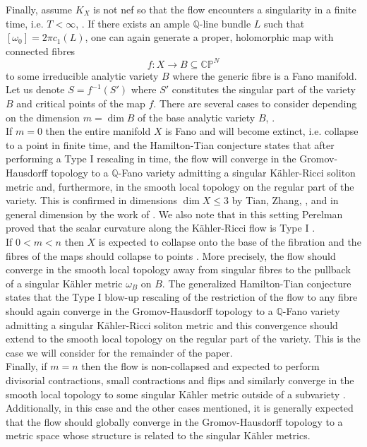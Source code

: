 \documentclass[12pt]{article}
\numberwithin{equation}{section}
\newcommand{\Q}{\mathbb{Q}}
\newcommand{\CP}{\mathbb{CP}}
\begin{document}
Finally, assume $K_X$ is not nef so that the flow encounters a singularity in a finite time, i.e. $T < \infty$, \cite{TZ06}. If there exists an ample $\Q$-line bundle $L$ such that $[\omega_0] = 2 \pi c_1(L)$, one can again generate a proper, holomorphic map with connected fibres
\begin{equation*}
    f: X \to B \subseteq \CP^N
\end{equation*}
to some irreducible analytic variety $B$ where the generic fibre is a Fano manifold. Let us denote $S = f^{-1}(S')$ where $S'$ constitutes the singular part of the variety $B$ and critical points of the map $f$. There are several cases to consider depending on the dimension $m = \dim B$ of the base analytic variety $B$, \cite{JST23, ZZ20}.\\
If $m = 0$ then the entire manifold $X$ is Fano and will become extinct, i.e. collapse to a point in finite time, and the Hamilton-Tian conjecture states that after performing a Type I rescaling in time, the flow will converge in the Gromov-Hausdorff topology to a $\Q$-Fano variety admitting a singular K\"ahler-Ricci soliton metric and, furthermore, in the smooth local topology on the regular part of the variety. This is confirmed in dimensions $\dim X \leq 3$ by Tian, Zhang, \cite{TZ16}, and in general dimension by the work of \cite{CW16,WZ21}. We also note that in this setting Perelman proved that the scalar curvature along the K\"ahler-Ricci flow is Type I \cite{ST08}.\\
If $0 < m < n$ then $X$ is expected to collapse onto the base of the fibration and the fibres of the maps should collapse to points \cite{JST23}. More precisely, the flow should converge in the smooth local topology away from singular fibres to the pullback of a singular K\"ahler metric $\omega_B$ on $B$. The generalized Hamilton-Tian conjecture states that the Type I blow-up rescaling of the restriction of the flow to any fibre should again converge in the Gromov-Hausdorff topology to a $\Q$-Fano variety admitting a singular K\"ahler-Ricci soliton metric and this convergence should extend to the smooth local topology on the regular part of the variety. This is the case we will consider for the remainder of the paper.\\
Finally, if $m = n$ then the flow is non-collapsed and expected to perform divisorial contractions, small contractions and flips and similarly converge in the smooth local topology to some singular K\"ahler metric outside of a subvariety \cite{JST23, ZZ20}. Additionally, in this case and the other cases mentioned, it is generally expected that the flow should globally converge in the Gromov-Hausdorff topology to a metric space whose structure is related to the singular K\"ahler metrics.\\
\end{document}
